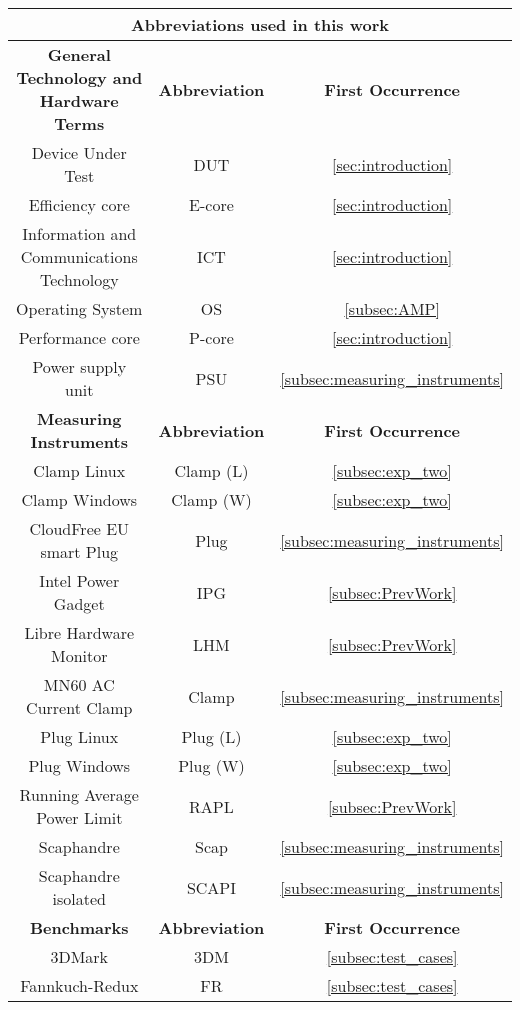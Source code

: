 \begin{table}[H]
    \centering
    \begin{tabular}{|| c | c | c ||}
    \hline
    \multicolumn{3}{||c||}{\textbf{Abbreviations used in this work}} \\ [0.5ex] \hline\hline
    \textbf{General Technology and Hardware Terms} & \textbf{Abbreviation} & \textbf{First Occurrence} \\\hline
    Device Under Test & DUT & \cref{sec:introduction}\\
    Efficiency core & E-core & \cref{sec:introduction}\\
    Information and Communications Technology & ICT & \cref{sec:introduction}\\
    Operating System & OS &\cref{subsec:AMP}\\
    Performance core & P-core & \cref{sec:introduction}\\
    Power supply unit & PSU & \cref{subsec:measuring_instruments}\\ 
    \hline
    \textbf{Measuring Instruments} & \textbf{Abbreviation} & \textbf{First Occurrence} \\\hline
    Clamp Linux& Clamp (L) & \cref{subsec:exp_two}\\
    Clamp Windows & Clamp (W) & \cref{subsec:exp_two}\\
    CloudFree EU smart Plug & Plug & \cref{subsec:measuring_instruments} \\
    Intel Power Gadget & IPG & \cref{subsec:PrevWork}\\
    Libre Hardware Monitor & LHM &\cref{subsec:PrevWork}\\
    MN60 AC Current Clamp & Clamp & \cref{subsec:measuring_instruments}\\
    Plug Linux & Plug (L) & \cref{subsec:exp_two}\\
    Plug Windows & Plug (W) & \cref{subsec:exp_two}\\
    Running Average Power Limit & RAPL & \cref{subsec:PrevWork}\\
    Scaphandre & Scap & \cref{subsec:measuring_instruments}\\
    Scaphandre isolated  & SCAPI & \cref{subsec:measuring_instruments}\\
    \hline 
    \textbf{Benchmarks} & \textbf{Abbreviation} & \textbf{First Occurrence} \\\hline
    3DMark  & 3DM & \cref{subsec:test_cases}\\
    Fannkuch-Redux& FR & \cref{subsec:test_cases}\\

\end{tabular}
\end{table}
